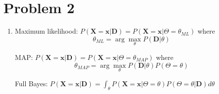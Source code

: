 \documentclass{article}
\begin{document}
\section*{Problem 2}
\begin{enumerate}
\item Maximum likelihood: $P(\mathbf X=\mathbf x | \mathbf
  D)=P(\mathbf X = \mathbf x | \Theta=\theta_{ML})$ where
  \[\theta_{ML} = \arg \max_\theta P(\mathbf D|\theta)\]

  MAP: $P(\mathbf X = \mathbf x | \mathbf D) = P(\mathbf X = \mathbf x
  | \Theta = \theta_{MAP})$ where
  \[\theta_{MAP} = \arg \max_\theta P(\mathbf D | \theta)P(\Theta = \theta)\]

  Full Bayes: $P(\mathbf X = \mathbf x | \mathbf D) = \int_\theta P(\mathbf X = \mathbf x | \Theta = \theta)P(\Theta = \theta | \mathbf D)d\theta$


\end{enumerate}
\end{document}
